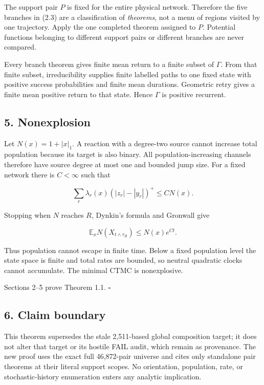 The support pair \(P\) is fixed for the entire physical network.
Therefore the five branches in (2.3) are a classification of
\emph{theorems}, not a menu of regions visited by one trajectory. Apply
the one completed theorem assigned to \(P\). Potential functions
belonging to different support pairs or different branches are never
compared.

Every branch theorem gives finite mean return to a finite subset of
\(\Gamma\). From that finite subset, irreducibility supplies finite
labelled paths to one fixed state with positive success probabilities
and finite mean durations. Geometric retry gives a finite mean positive
return to that state. Hence \(\Gamma\) is positive recurrent.

\subsection{5. Nonexplosion}

Let \(N(x)=1+|x|_1\). A reaction with a degree-two source cannot
increase total population because its target is also binary. All
population-increasing channels therefore have source degree at most one
and bounded jump size. For a fixed network there is \(C<\infty\) such
that

\[
 \sum_r\lambda_r(x)(|z_r|-|y_r|)^+\le C N(x).        \tag{5.1}
\]

Stopping when \(N\) reaches \(R\), Dynkin's formula and Gronwall give

\[
       \mathbb E_xN(X_{t\wedge\tau_R})\le N(x)e^{Ct}. \tag{5.2}
\]

Thus population cannot escape in finite time. Below a fixed population
level the state space is finite and total rates are bounded, so neutral
quadratic clocks cannot accumulate. The minimal CTMC is nonexplosive.

Sections 2--5 prove Theorem 1.1. \(\square\)

\subsection{6. Claim boundary}

This theorem supersedes the stale 2,511-based global composition target;
it does not alter that target or its hostile FAIL audit, which remain as
provenance. The new proof uses the exact full 46,872-pair universe and
cites only standalone pair theorems at their literal support scopes. No
orientation, population, rate, or stochastic-history enumeration enters
any analytic implication.
